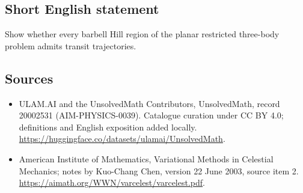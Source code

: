 \documentclass[11pt]{article}
\begin{document}
\subsection{Short English statement}
Show whether every barbell Hill region of the planar restricted three-body problem admits transit trajectories.
\subsection{Sources}
\begin{itemize}
\item[\hypertarget{source:20002531:1}{S1}] ULAM.AI and the UnsolvedMath Contributors, UnsolvedMath, record 20002531 (AIM-PHYSICS-0039). Catalogue curation under CC BY 4.0; definitions and English exposition added locally.
\url{https://huggingface.co/datasets/ulamai/UnsolvedMath}.
\item[\hypertarget{source:20002531:2}{S2}] American Institute of Mathematics, Variational Methods in Celestial Mechanics; notes by Kuo-Chang Chen, version 22 June 2003, source item 2.
\url{https://aimath.org/WWN/varcelest/varcelest.pdf}.
\end{itemize}
\label{end:20002531}
\end{document}
